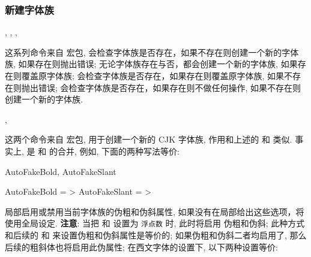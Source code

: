 \subsubsection{新建字体族}
\begin{function}[added=2025-04-26]{\newfontfamily, \setfontfamily, \renewfontfamily, \providefontfamily}
  \begin{syntax}
  \end{syntax}
  这系列命令来自  宏包,  会检查字体族是否存在，如果不存在则创建一个新的字体族,
  如果存在则抛出错误;  无论字体族存在与否，都会创建一个新的字体族, 如果存在则覆盖原字体族;
   会检查字体族是否存在，如果存在则覆盖原字体族, 如果不存在则抛出错误; 
  会检查字体族是否存在，如果存在则不做任何操作, 如果不存在则创建一个新的字体族. 
\end{function}


\begin{function}[added=2025-04-26]{\newCJKfontfamily, \setCJKfamilyfont}
  \begin{syntax}
  \end{syntax}
  这两个命令来自  宏包, 用于创建一个新的 CJK 字体族, 作用和上述的  和  类似.
  事实上,  是  和  的合并, 例如, 下面的两种写法等价:
\end{function}
\begin{DocExample}
\newCJKfontfamily[song]

\newcommand*{\songti}{\CJKfamily{song}}
\end{DocExample}

\begin{keyval}[added=2025-04-26, parent=xeCJK/options]{AutoFakeBold, AutoFakeSlant}
  \begin{syntax}
    AutoFakeBold  = >
    AutoFakeSlant = >
  \end{syntax}
  局部启用或禁用当前字体族的伪粗和伪斜属性, 如果没有在局部给出这些选项，将使用全局设定. \textbf{注意}:%
  当把 \texttt{} 和 \texttt{} 设置为 \texttt{浮点数} 时, 此时将启用
  伪粗和伪斜; 此种方式和后续的 和  来设置伪粗和伪斜属性是等价的;
  如果伪粗和伪斜二者均启用了, 那么后续的粗斜体也将启用此伪属性; 在西文字体的设置下, 以下两种设置等价:
\end{keyval}
\begin{DocExample}
\end{DocExample}


